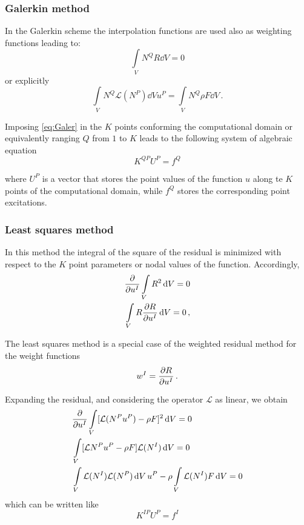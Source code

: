 \subsubsection{Galerkin method}
In the Galerkin scheme the interpolation functions are used also as weighting functions leading to:
\[\int\limits_V N^Q R\dd{V} = 0 \]
or explicitly
\begin{equation}
  \int\limits_V N^Q \mathcal{L} (N^P)\dd{V} u^P = \int\limits_V N^Q\rho F\dd{V}\, .
  \label{eq:Galer}
\end{equation}

Imposing \cref{eq:Galer} in the $K$ points conforming the computational domain or equivalently ranging $Q$ from $1$ to $K$ leads to the following system of algebraic equation
\begin{equation}
{K^{QP}}{U^P} = {f^Q}
\label{eq:DGaler}
\end{equation}

where $U^P$ is a vector that stores the point values of the function $u$ along te $K$ points of the computational domain, while $f^Q$ stores the corresponding point excitations.

\subsubsection{Least squares method}
In this method the integral of the square of the residual is minimized with respect to the $K$ point parameters or nodal values of the function. Accordingly,
\begin{align*}
  &\pdv{u^I}\int\limits_V R^2 \dd{V} = 0\\
  &\int\limits_V R \pdv{R}{u^I} \dd{V} = 0\, ,
\end{align*}

The least squares method is a special case of the weighted residual method for the weight functions
\[w^I = \pdv{R}{u^I}\, .\]

Expanding the residual, and considering the operator $\mathcal{L}$ as linear, we obtain
\begin{align*}
  &\pdv{u^I}\int\limits_V [\mathcal{L}(N^P u^P) - \rho F]^2 \dd{V} = 0\\
  &\int\limits_V [\mathcal{L} N^P u^P - \rho F] \mathcal{L}(N^I) \dd{V} = 0\\
 &\int\limits_V \mathcal{L}(N^I) \mathcal{L}(N^P) \dd{V} u^P - \rho \int\limits_V \mathcal{L}(N^I) F \dd{V} = 0
\end{align*}
which can be written like
\begin{equation}
  K^{IP} U^P = f^I
  \label{eq:Dsquares}
\end{equation}

